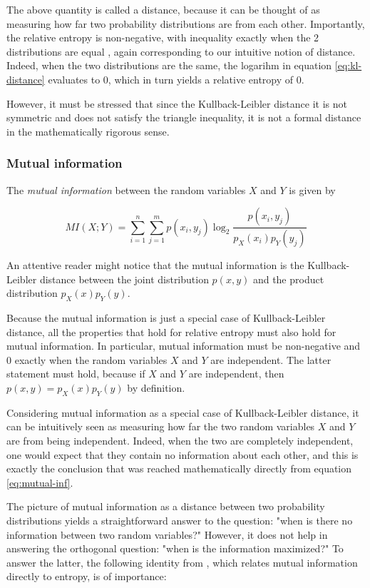 \documentclass[12pt]{article}
\begin{document}
The above quantity is called a distance, because it can be thought of as measuring how far two probability distributions are from each other. Importantly, the relative entropy is non-negative, with inequality exactly when the 2 distributions are equal \cite{cover-thomas}, again corresponding to our intuitive notion of distance. Indeed, when the two distributions are the same, the logarihm in equation \ref{eq:kl-distance} evaluates to 0, which in turn yields a relative entropy of 0. 

However, it must be stressed that since the Kullback-Leibler distance it is not symmetric and does not satisfy the triangle inequality, it is not a formal distance in the mathematically rigorous sense.

\subsubsection{Mutual information}

The \textit{mutual information} \cite{cover-thomas} between the random variables $X$ and $Y$ is given by 

\begin{equation}
MI(X;Y) = \sum_{i=1}^n \sum_{j=1}^m p(x_i,y_j) \log_2 \frac{p(x_i,y_j)}{p_X(x_i)p_Y(y_j)}
\label{eq:mutual-inf}
\end{equation}

An attentive reader might notice that the mutual information is the Kullback-Leibler distance between the joint distribution $p(x,y)$ and the product distribution $p_X(x)p_Y(y)$.

Because the mutual information is just a special case of Kullback-Leibler distance, all the properties that hold for relative entropy must also hold for mutual information. In particular, mutual information must be non-negative and 0 exactly when the random variables $X$ and $Y$ are independent. The latter statement must hold, because if $X$ and $Y$ are independent, then $p(x,y) = p_X(x)p_Y(y)$ by definition. 

Considering mutual information as a special case of Kullback-Leibler distance, it can be intuitively seen as measuring how far the two random variables $X$ and $Y$ are from being independent. Indeed, when the two are completely independent, one would expect that they contain no information about each other, and this is exactly the conclusion that was reached mathematically directly from equation \ref{eq:mutual-inf}.

The picture of mutual information as a distance between two probability distributions yields a straightforward answer to the question: "when is there no information between two random variables?" However, it does not help in answering the orthogonal question: "when is the information maximized?" To answer the latter, the following identity from \cite{cover-thomas}, which relates mutual information directly to entropy, is of importance: 
\end{document}

